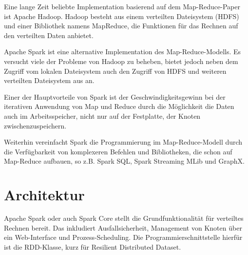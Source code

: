 
Eine lange Zeit beliebte Implementation basierend auf dem Map-Reduce-Paper\cite{mapreduce2004} ist Apache Hadoop\cite{hadoop}. Hadoop besteht aus einem verteilten Dateisystem (HDFS) und einer Bibliothek namens MapReduce, die Funktionen für das Rechnen auf den verteilten Daten anbietet.

Apache Spark\cite{spark} ist eine alternative Implementation des Map-Reduce-Modells. Es versucht viele der Probleme von Hadoop zu beheben, bietet jedoch neben dem Zugriff vom lokalen Dateisystem auch den Zugriff von HDFS und weiteren verteilten Dateisystem aus an.

Einer der Hauptvorteile von Spark ist der Geschwindigkeitsgewinn bei der iterativen Anwendung von Map und Reduce durch die Möglichkeit die Daten auch im Arbeitsspeicher, nicht nur auf der Festplatte, der Knoten zwischenzuspeichern.

Weiterhin vereinfacht Spark die Programmierung im Map-Reduce-Modell durch die Verfügbarkeit von komplexeren Befehlen und Bibliotheken, die schon auf Map-Reduce aufbauen, so z.B. Spark SQL, Spark Streaming MLib und GraphX.


\section{Architektur}

%
%


Apache Spark oder auch Spark Core stellt die Grundfunktionalität für verteiltes Rechnen bereit. Das inkludiert Ausfallsicherheit, Management von Knoten über ein Web-Interface und Prozess-Scheduling\cite{learningspark}. Die Programmierschnittstelle hierfür ist die RDD-Klasse, kurz für Resilient Distributed Dataset.

